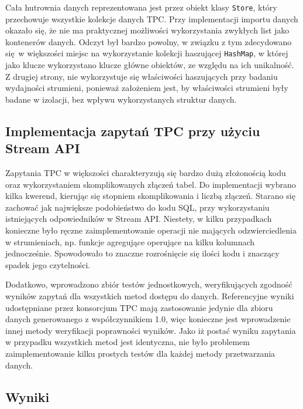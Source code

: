 \documentclass[12pt]{extarticle}
\begin{document}
    Cała hutrownia danych reprezentowana jest przez obiekt klasy \texttt{Store}, który przechowuje wszystkie kolekcje danych TPC. Przy implementacji importu danych okazało się, że nie ma praktycznej możliwości wykorzystania zwykłych list jako kontenerów danych. Odczyt był bardzo powolny, w związku z tym zdecydowano się w większości miejsc na wykorzystanie kolekcji haszującej \texttt{HashMap}, w której jako klucze wykorzystano klucze główne obiektów, ze względu na ich unikalność. Z drugiej strony, nie wykorzystuje się właściwości haszujących przy badaniu wydajności strumieni, ponieważ założeniem jest, by właściwości strumieni były badane w izolacji, bez wpływu wykorzystanych struktur danych.


\subsection{Implementacja zapytań TPC przy użyciu Stream API}

Zapytania TPC w większości charakteryzują się bardzo dużą złożonością kodu oraz wykorzystaniem skomplikowanych złączeń tabel. Do implementacji wybrano kilka kwerend, kierując się stopniem skomplikowania i liczbą złączeń. Starano się zachować jak największe podobieństwo do kodu SQL, przy wykorzystaniu istniejących odpowiedników w Stream API. Niestety, w kilku przypadkach konieczne było ręczne zaimplementowanie operacji nie mających odzwierciedlenia w strumieniach, np. funkcje agregujące operujące na kilku kolumnach jednocześnie. Spowodowało to znaczne rozrośnięcie się ilości kodu i znaczący spadek jego czytelności. 

    Dodatkowo, wprowadzono zbiór testów jednostkowych, weryfikujących zgodność wyników zapytań dla wszystkich metod dostępu do danych. Referencyjne wyniki \cite{tpcresults} udostępniane przez konsorcjum TPC mają zastosowanie jedynie dla zbioru danych generowanego z współczynnikiem 1.0, więc konieczne jest wprowadzenie innej metody weryfikacji poprawności wyników. Jako iż postać wyniku zapytania w przypadku wszystkich metod jest identyczna, nie było problemem zaimplementowanie kilku prostych testów dla każdej metody przetwarzania danych.


\subsection{Wyniki}
\end{document}
